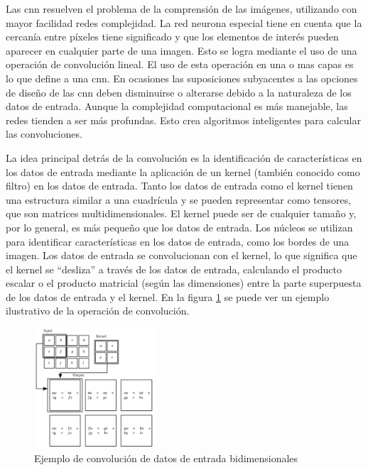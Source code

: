 Las \gls{cnn} resuelven el problema de la comprensión de las imágenes, utilizando con mayor facilidad redes complejidad. La red neurona especial tiene en cuenta que la cercanía entre píxeles tiene significado y que los elementos de interés pueden aparecer en cualquier parte de una imagen. Esto se logra mediante el uso de una operación de convolución lineal. El uso de esta operación en una o mas capas es lo que define a una \gls{cnn}. En ocasiones las suposiciones subyacentes a las opciones de diseño de las \gls{cnn} deben disminuirse o alterarse debido a la naturaleza de los datos de entrada. Aunque la complejidad computacional es más manejable, las redes tienden a ser más profundas. Esto crea algoritmos inteligentes para calcular las convoluciones.

La idea principal detrás de la convolución es la identificación de características en los datos de entrada mediante la aplicación de un kernel (también conocido como filtro) en los datos de entrada. Tanto los datos de entrada como el kernel tienen una estructura similar a una cuadrícula y se pueden representar como tensores, que son matrices multidimensionales. El kernel puede ser de cualquier tamaño y, por lo general, es más pequeño que los datos de entrada. Los núcleos se utilizan para identificar características en los datos de entrada, como los bordes de una imagen. Los datos de entrada se convolucionan con el kernel, lo que significa que el kernel se ``desliza'' a través de los datos de entrada, calculando el producto escalar o el producto matricial (según las dimensiones) entre la parte superpuesta de los datos de entrada y el kernel. En la figura \ref{fig:ejemplo-convolucion} se puede ver un ejemplo ilustrativo de la operación de convolución.

\begin{figure}[ht]
\centering
\includegraphics[width=0.4\textwidth]{img/chapters/estado-del-arte/ejemplo-convolucion.png}
\caption{\label{fig:ejemplo-convolucion}Ejemplo de convolución de datos de entrada bidimensionales}
\end{figure}

